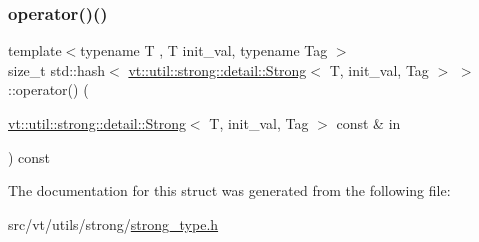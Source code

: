 \subsubsection{\texorpdfstring{operator()()}{operator()()}}
{\footnotesize\ttfamily template$<$typename T , T init\+\_\+val, typename Tag $>$ \\
size\+\_\+t std\+::hash$<$ \hyperlink{structvt_1_1util_1_1strong_1_1detail_1_1_strong}{vt\+::util\+::strong\+::detail\+::\+Strong}$<$ T, init\+\_\+val, Tag $>$ $>$\+::operator() (\begin{DoxyParamCaption}\item[{\hyperlink{structvt_1_1util_1_1strong_1_1detail_1_1_strong}{vt\+::util\+::strong\+::detail\+::\+Strong}$<$ T, init\+\_\+val, Tag $>$ const \&}]{in }\end{DoxyParamCaption}) const\hspace{0.3cm}{\ttfamily [inline]}}



The documentation for this struct was generated from the following file\+:\begin{DoxyCompactItemize}
\item 
src/vt/utils/strong/\hyperlink{strong__type_8h}{strong\+\_\+type.\+h}\end{DoxyCompactItemize}
